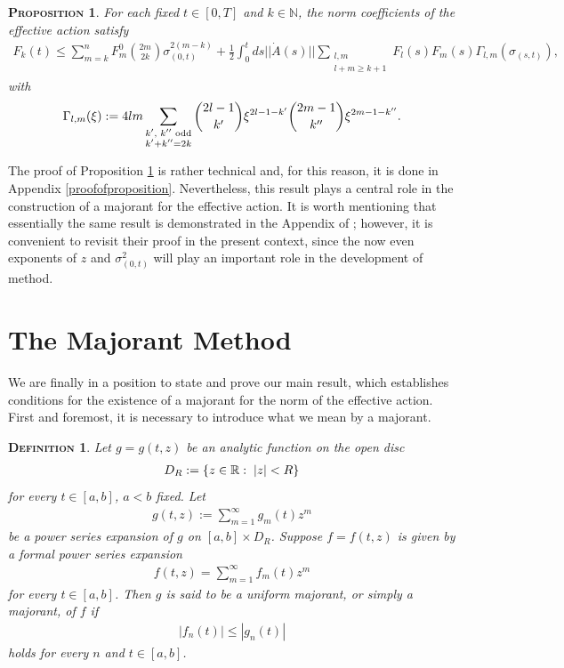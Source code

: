 \documentclass[12pt,twoside]{amsart}
\newtheorem{defi}{\textsc{Definition}}[section]
\newtheorem{prop}{\textsc{Proposition}} [section]
\numberwithin{equation}{section}
\begin{document}
\begin{prop}\label{coefficientsinequality} For each fixed $t \in [0,T]$ and $k \in \mathbb{N}$, the norm coefficients of the effective action satisfy
\begin{eqnarray}
F_{k}(t) \le \sum_{m=k}^{n}F_{m}^{0}\binom{2m}{2k}\sigma_{(0,t)}^{2(m-k)}+\frac{1}{2}\int_{0}^{t}ds ||\dot{A}(s)|| \sum_{\substack{l,m \\ l+m \ge k+1}} F_{l}(s)F_{m}(s)\Gamma_{l,m}(\sigma_{(s,t)}), \label{RGT18}
\end{eqnarray}
with
\begin{eqnarray}
\Gamma_{l,m}(\xi) := 4lm \sum_{\substack{\textup{$k'$, $k''$ odd} \\k'+k'' = 2k}}\binom{2l-1}{k'}\xi^{2l-1-k'}\binom{2m-1}{k''}\xi^{2m-1-k''}. \label{RGT19}
\end{eqnarray}
\end{prop}

The proof of Proposition \ref{coefficientsinequality} is rather technical and, for this reason, it is done in Appendix \ref{proofofproposition}. Nevertheless, this result plays a central role in the construction of a majorant for the effective action. It is worth mentioning that essentially the same result is demonstrated in the Appendix  of \cite{BryWri}; however, it is convenient to revisit their proof in the present context, since the now even exponents of $z$ and $\sigma_{(0,t)}^{2}$ will play an important role in the development of method. 

\section{The Majorant Method}\label{majorantmethod}

We are finally in a position to state and prove our main result, which establishes conditions for the existence of a majorant for the norm of the effective action. First and foremost, it is necessary to  introduce what we mean by a majorant.

\begin{defi} Let $g = g(t,z)$ be an analytic function on the open disc
\begin{eqnarray}
D_{R}:= \{z \in \mathbb{R}: \hspace{0.1cm} |z| < R\} \nonumber
\end{eqnarray}
for every $t \in [a,b]$, $a< b$ fixed. Let 
\begin{eqnarray}
g(t,z) := \sum_{m=1}^{\infty}g_{m}(t)z^{m} \nonumber
\end{eqnarray}
be a power series expansion of $g$ on $[a,b]\times D_{R}$. Suppose $f = f(t,z)$ is given by a formal power series expansion
\begin{eqnarray}
f(t,z) = \sum_{m=1}^{\infty} f_{m}(t)z^{m} \nonumber
\end{eqnarray}
for every $t \in [a,b]$. Then $g$ is said to be a uniform majorant, or simply a majorant, of $f$ if
\begin{eqnarray}
|f_{n}(t)| \le |g_{n}(t)| \nonumber
\end{eqnarray}
holds for every $n$ and $t \in [a,b]$.
\end{defi}
\end{document}
